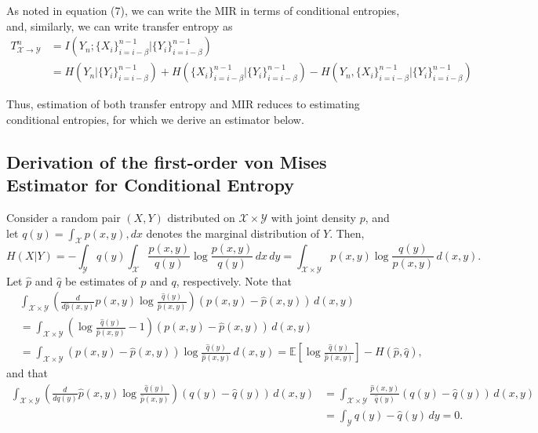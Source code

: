 \documentclass{article} %
\newcommand{\X}{\mathcal{X}}                        %
\newcommand{\Y}{\mathcal{Y}}                        %
\newcommand{\E}{\mathbb{E}}                         %
\renewcommand{\hat}{\widehat}
\begin{document}
As noted in equation (7), we can write the MIR in terms of
conditional entropies, and, similarly, we can write transfer entropy as
\begin{align*}
T_{\X \to \Y}^n
 &  = I(Y_n; \{X_i\}_{i = i - \beta}^{n - 1}
                                        | \{Y_i\}_{i = i - \beta}^{n - 1}) \\
 &  = H(Y_n | \{Y_i\}_{i = i - \beta}^{n - 1})
    + H(\{X_i\}_{i = i - \beta}^{n - 1} | \{Y_i\}_{i = i - \beta}^{n - 1})
    - H(Y_n,\{X_i\}_{i = i - \beta}^{n - 1} | \{Y_i\}_{i = i - \beta}^{n - 1})
\end{align*}

Thus, estimation of both transfer entropy and MIR reduces to estimating
conditional entropies, for which we derive an estimator below.

\subsection{Derivation of the first-order von Mises Estimator for Conditional
Entropy}
Consider a random pair $(X,Y)$ distributed on $\X \times \Y$ with joint density
$p$, and let $q(y) = \int_\X p(x,y), dx$ denotes the marginal distribution of
$Y$. Then,
\[H(X | Y)
    = -\int_\Y q(y) \int_\X \frac{p(x,y)}{q(y)} \log\frac{p(x,y)}{q(y)}\,dx\,dy
    = \int_{\X \times \Y} p(x,y) \log \frac{q(y)}{p(x,y)} \, d(x,y).\]
Let $\hat p$ and $\hat q$ be estimates of $p$ and $q$, respectively. Note that
\begin{align*}
 & \int_{\X \times \Y} \left( \frac{d}{d\hat p(x,y)} p(x,y)
                                    \log \frac{\hat q(y)}{\hat p(x,y)} \right)
                                            (p(x,y) - \hat p(x,y))\, d(x,y) \\
 &  = \int_{\X \times \Y} \left( \log \frac{\hat q(y)}{\hat p(x,y)} - 1 \right)
    \left( p(x,y) - \hat p(x,y) \right) \, d(x,y) \\
 &  = \int_{\X \times \Y} \left( p(x,y) - \hat p(x,y) \right)
                            \log \frac{\hat q(y)}{\hat p(x,y)} \, d(x,y)
    = \E\left[ \log \frac{\hat q(y)}{\hat p(x,y)} \right] - H(\hat p, \hat q),
\end{align*}
and that
\begin{align*}
\int_{\X \times \Y} \left( \frac{d}{dq(y)} \hat p(x,y)
                                    \log \frac{\hat q(y)}{\hat p(x,y)} \right)
                                            (q(y) - \hat q(y)) \, d(x,y)
 &  = \int_{\X \times \Y} \frac{\hat p(x,y)}{\hat q(y)}
                                            (q(y) - \hat q(y)) \, d(x,y)    \\
 &  = \int_\Y q(y) - \hat q(y) \, dy
    = 0.
\end{align*}
\end{document}
